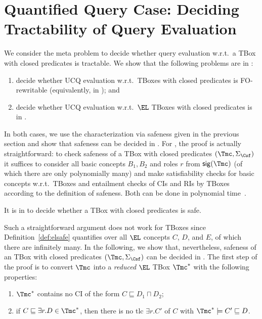 \documentclass{lmcs}
\theoremstyle{definition}
\begin{document}
\section{Quantified Query Case: Deciding Tractability of \ptime Query Evaluation}
\label{sec:tboxdec}
We consider the meta problem to decide whether query evaluation w.r.t.~a TBox with closed predicates is tractable.
We show that the following problems are in \ptime:
\begin{enumerate}
\item decide whether UCQ evaluation w.r.t.~\dlliter TBoxes with closed predicates is FO-rewritable (equivalently, in \ptime); and
\item decide whether UCQ evaluation w.r.t.~$\EL$ TBoxes with closed predicates is in \ptime. 
\end{enumerate}
In both cases, we use the characterization via safeness given in the previous section and show that safeness can be decided in \ptime.
For \dlliter, the proof is actually straightforward: to check safeness of a \dlliter TBox with closed predicates $(\Tmc,\Sigma_\Csf)$ 
it suffices to consider all basic concepts $B_1,B_2$ and roles $r$ from ${\sf sig}(\Tmc)$ (of which there are only polynomially many) 
and make satisfiability checks for basic concepts w.r.t.~\dlliter TBoxes and entailment checks of \dllitecore CIs and RIs by \dlliter TBoxes
according to the definition of safeness. Both can be done in polynomial time~\cite{CDLLR07}.
%
\begin{thm}
It is in \ptime to decide whether a \dlliter TBox with closed predicates is safe.
\end{thm}
Such a straightforward argument does not work for \EL TBoxes
since Definition~\ref{def:elsafe} quantifies over all $\EL$ concepts $C$,
$D$, and $E$, of which there are infinitely many. In the following, we
show that, nevertheless, safeness of an \EL TBox with closed
predicates $(\Tmc,\Sigma_\Csf)$ can be decided in \PTime. The first step of the proof is
to convert $\Tmc$ into a \emph{reduced} $\EL$ TBox $\Tmc^*$ with the following properties:
%
\begin{enumerate}
      \renewcommand{\theenumi}{(red\arabic{enumi})}
      \renewcommand{\labelenumi}{\theenumi}

\item\label{tstarcond1} $\Tmc^*$ contains no CI of the form $C \sqsubseteq D_1 \sqcap D_2$;

\item\label{tstarcond2} if $C \sqsubseteq \exists r . D \in \Tmc^*$,
then there is no tlc $\exists r.C'$ of $C$ with $\Tmc^* \models C' \sqsubseteq D$.

\end{enumerate}
\end{document}
